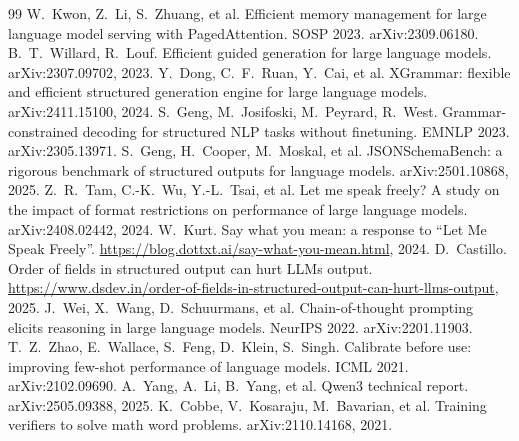 \documentclass[10pt,twocolumn]{article}
\begin{document}
\begin{thebibliography}{99}\small
{} W.~Kwon, Z.~Li, S.~Zhuang, et al. Efficient memory management for large language model serving with PagedAttention. SOSP 2023. arXiv:2309.06180.
 B.~T.~Willard, R.~Louf. Efficient guided generation for large language models. arXiv:2307.09702, 2023.
 Y.~Dong, C.~F.~Ruan, Y.~Cai, et al. XGrammar: flexible and efficient structured generation engine for large language models. arXiv:2411.15100, 2024.
 S.~Geng, M.~Josifoski, M.~Peyrard, R.~West. Grammar-constrained decoding for structured NLP tasks without finetuning. EMNLP 2023. arXiv:2305.13971.
 S.~Geng, H.~Cooper, M.~Moskal, et al. JSONSchemaBench: a rigorous benchmark of structured outputs for language models. arXiv:2501.10868, 2025.
 Z.~R.~Tam, C.-K.~Wu, Y.-L.~Tsai, et al. Let me speak freely? A study on the impact of format restrictions on performance of large language models. arXiv:2408.02442, 2024.
 W.~Kurt. Say what you mean: a response to ``Let Me Speak Freely''. \url{https://blog.dottxt.ai/say-what-you-mean.html}, 2024.
 D.~Castillo. Order of fields in structured output can hurt LLMs output. \url{https://www.dsdev.in/order-of-fields-in-structured-output-can-hurt-llms-output}, 2025.
 J.~Wei, X.~Wang, D.~Schuurmans, et al. Chain-of-thought prompting elicits reasoning in large language models. NeurIPS 2022. arXiv:2201.11903.
 T.~Z.~Zhao, E.~Wallace, S.~Feng, D.~Klein, S.~Singh. Calibrate before use: improving few-shot performance of language models. ICML 2021. arXiv:2102.09690.
 A.~Yang, A.~Li, B.~Yang, et al. Qwen3 technical report. arXiv:2505.09388, 2025.
 K.~Cobbe, V.~Kosaraju, M.~Bavarian, et al. Training verifiers to solve math word problems. arXiv:2110.14168, 2021.
\end{thebibliography}
\end{document}
